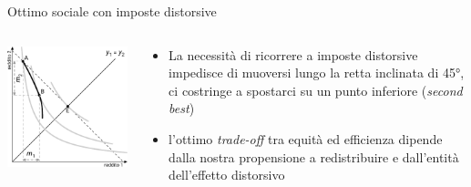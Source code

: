 \documentclass[aspectratio=64,11pt]{beamer}
\begin{document}
\begin{frame}{Ottimo sociale con imposte distorsive}
\begin{columns}
\begin{column}{.55\columnwidth}
\begin{center}
\includegraphics[width=\textwidth]{./figure/fbs-6.pdf}
\end{center}
\end{column}


\begin{column}{.45\columnwidth}
\begin{itemize}
\item La necessità di ricorrere a imposte distorsive impedisce di muoversi lungo la retta inclinata di 45°, ci costringe a spostarci su un punto inferiore (\emph{second best})
\item l'ottimo \emph{trade-off} tra equità ed efficienza dipende dalla nostra propensione a redistribuire e dall'entità dell'effetto distorsivo
\end{itemize}
\end{column}
\end{columns}
\end{frame}
\end{document}

